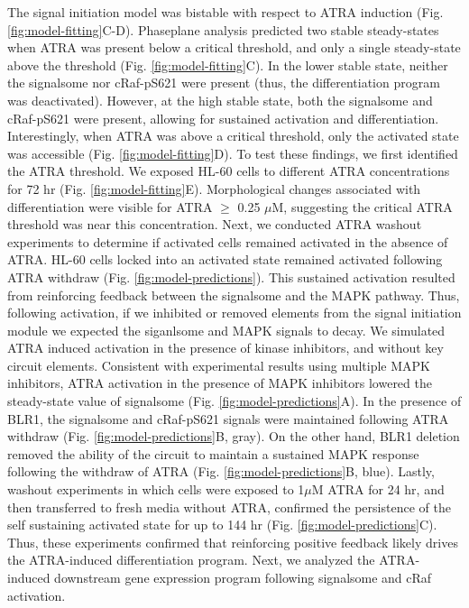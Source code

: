\documentclass[12pt]{article}
\begin{document}

The signal initiation model was bistable with respect to ATRA induction (Fig. \ref{fig:model-fitting}C-D).
Phaseplane analysis predicted two stable steady-states when ATRA was present below a critical threshold, and only a single steady-state above the threshold (Fig. \ref{fig:model-fitting}C).
In the lower stable state, neither the signalsome nor cRaf-pS621 were present (thus, the differentiation program was deactivated).
However, at the high stable state, both the signalsome and cRaf-pS621 were present, allowing for sustained activation and differentiation.
Interestingly, when ATRA was above a critical threshold, only the activated state was accessible (Fig. \ref{fig:model-fitting}D).
To test these findings, we first identified the ATRA threshold. We exposed HL-60 cells to different ATRA concentrations for 72 hr (Fig. \ref{fig:model-fitting}E).
Morphological changes associated with differentiation were visible for ATRA $\geq$ 0.25 $\mu$M, suggesting the critical ATRA
threshold was near this concentration. Next, we conducted ATRA washout experiments to determine if activated cells remained activated in the absence of ATRA.
HL-60 cells locked into an activated state remained activated following ATRA withdraw (Fig. \ref{fig:model-predictions}).
This sustained activation resulted from reinforcing feedback between the signalsome and the MAPK pathway.
Thus, following activation, if we inhibited or removed elements from the signal initiation module we expected the siganlsome and MAPK signals to decay.
We simulated ATRA induced activation in the presence of kinase inhibitors, and without key circuit elements.
Consistent with experimental results using multiple MAPK inhibitors, ATRA activation in the presence of MAPK inhibitors lowered the steady-state value of signalsome (Fig. \ref{fig:model-predictions}A).
In the presence of BLR1, the signalsome and cRaf-pS621 signals were maintained following ATRA withdraw (Fig. \ref{fig:model-predictions}B, gray).
On the other hand, BLR1 deletion removed the ability of the circuit to maintain a sustained MAPK response following the withdraw of ATRA (Fig. \ref{fig:model-predictions}B, blue).
Lastly, washout experiments in which cells were exposed to 1$\mu$M ATRA for 24 hr, and then transferred to fresh media without ATRA,
confirmed the persistence of the self sustaining activated state for up to 144 hr (Fig. \ref{fig:model-predictions}C).
Thus, these experiments confirmed that reinforcing positive feedback likely drives the ATRA-induced differentiation program.
Next, we analyzed the ATRA-induced downstream gene expression program following signalsome and cRaf activation.
\end{document}
